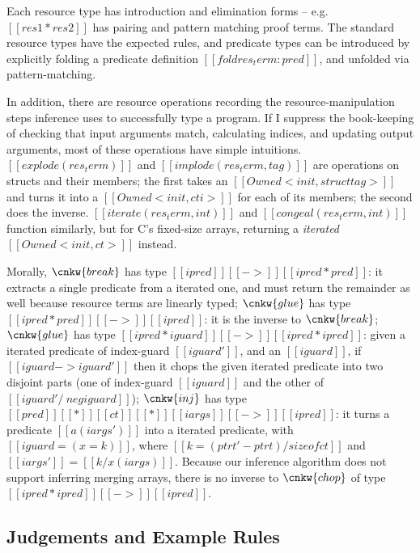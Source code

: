 \documentclass[11pt]{article}%
\begin{document}
Each resource type has introduction and elimination forms -- e.g.
$[[ res1 * res2 ]]$ has pairing and pattern matching proof terms. The
standard resource types have the expected rules, and predicate types
can be introduced by explicitly folding a predicate definition
$[[ fold res_term : pred ]]$, and unfolded via pattern-matching.


In addition, there are resource operations recording the
resource-manipulation steps inference uses to successfully type a
program.  If I suppress the book-keeping of checking that input
arguments match, calculating indices, and updating output arguments,
most of these operations have simple intuitions.
%
$[[ explode ( res_term ) ]]$ and $[[ implode ( res_term , tag ) ]]$
are operations on structs and their members; the first takes an
$[[ Owned < init , struct tag > ]]$ and turns it into a
$[[ Owned < init , cti > ]]$ for each of its members; the second does the
inverse.  $[[ iterate ( res_term , int ) ]]$ and
$[[ congeal ( res_term , int ) ]]$ function similarly, but for C's
fixed-size arrays, returning a \emph{iterated} $[[ Owned < init , ct > ]]$
instead.

Morally,
$\cnkw{break}$ has type $[[ ipred ]] [[ -> ]] [[ ipred * pred ]]$: it
extracts a single predicate from a iterated one, and must return the
remainder as well because resource terms are linearly typed;
$\cnkw{glue}$ has type $[[ ipred * pred ]] [[ -> ]] [[ ipred ]]$: it
is the inverse to $\cnkw{break}$; $\cnkw{glue}$ has type
$[[ ipred * iguard ]] [[ -> ]] [[ ipred * ipred ]]$: given a
iterated predicate of index-guard $[[ iguard' ]]$, and an
$[[ iguard ]]$, if $[[ iguard -> iguard' ]]$ then it chops the given
iterated predicate into two disjoint parts (one of index-guard
$[[ iguard ]]$ and the other of $[[ iguard' /\ neg iguard ]]$);
$\cnkw{inj}$ has type
$[[ pred ]] [[ * ]] [[ ct ]] [[ * ]] [[ iargs ]] [[ -> ]] [[ ipred ]]$:
it turns a predicate $[[ a ( iargs' ) ]]$ into a iterated
predicate, with $[[ iguard = ( x = k ) ]]$, where
$[[ k = ( ptrt' - ptrt ) / sizeof ct ]]$ and
$[[ iargs' ]] = [[ k / x ( iargs ) ]]$. Because our inference
algorithm does not support inferring merging
arrays, there is no inverse to
$\cnkw{chop}$ of type $[[ ipred * ipred ]] [[ -> ]] [[ ipred ]]$.

\subsection{Judgements and Example Rules}
\label{subsec:judgm_eg_rules}
\end{document}
